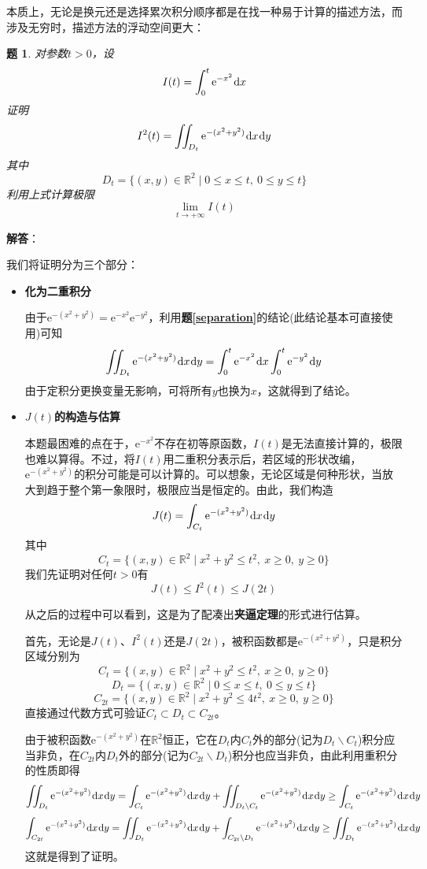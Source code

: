 \documentclass[a4paper,UTF8,fontset=windows,AutoFakeBold]{ctexart}
\newcommand*{\dr}{\hspace{0.07em}\mathrm{d}}
\newcommand*{\er}{\mathrm{e}}
\newcommand*{\rb}{\mathbb{R}}
\newcommand*{\note}{\noindent *}
\theoremstyle{ex}
\newtheorem{exercise}{题}
\newcommand{\exref}[1]{\textbf{题\;\ref{#1}\;}}
\newcommand{\sol}[1]{{\vspace{5pt}\kaishu\noindent\textbf{解答}：\vspace{-3pt}
\begin{compactitem}
    \item[] #1
\end{compactitem}
}}
\begin{document}
本质上，无论是换元还是选择累次积分顺序都是在找一种易于计算的描述方法，而涉及无穷时，描述方法的浮动空间更大：
\begin{framed}
\begin{exercise}\label{gauss}
    对参数$t>0$，设
    $$I(t)=\int_0^t\er^{-x^2}\dr x$$
    证明
    $$I^2(t)=\iint_{D_t}\er^{-(x^2+y^2)}\dr x\dr y$$
    其中
    $$D_t=\{(x,y)\in\rb^2\mid0\le x\le t,\ 0\le y\le t\}$$
    利用上式计算极限
    $$\lim_{t\to+\infty}I(t)$$
\end{exercise}
\sol{
    我们将证明分为三个部分：
    \begin{itemize}
        \item \textbf{化为二重积分}
        
        由于$\er^{-(x^2+y^2)}=\er^{-x^2}\er^{-y^2}$，利用\exref{separation}的结论(此结论基本可直接使用)可知
        $$\iint_{D_t}\er^{-(x^2+y^2)}\dr x\dr y=\int_0^t\er^{-x^2}\dr x\int_0^t\er^{-y^2}\dr y$$
        由于定积分更换变量无影响，可将所有$y$也换为$x$，这就得到了结论。

        \item \textbf{$J(t)$的构造与估算}

        本题最困难的点在于，$\er^{-x^2}$不存在初等原函数，$I(t)$是无法直接计算的，极限也难以算得。不过，将$I(t)$用二重积分表示后，若区域的形状改编，$\er^{-(x^2+y^2)}$的积分可能是可以计算的。可以想象，无论区域是何种形状，当放大到趋于整个第一象限时，极限应当是恒定的。由此，我们构造
        $$J(t)=\int_{C_t}\er^{-(x^2+y^2)}\dr x\dr y$$
        其中
        $$C_t=\{(x,y)\in\rb^2\mid x^2+y^2\le t^2,\ x\ge0,\ y\ge0\}$$
        我们先证明对任何$t>0$有
        $$J(t)\le I^2(t)\le J(2t)$$

        \note 从之后的过程中可以看到，这是为了配凑出\textbf{夹逼定理}的形式进行估算。

        首先，无论是$J(t)$、$I^2(t)$还是$J(2t)$，被积函数都是$\er^{-(x^2+y^2)}$，只是积分区域分别为
        $$C_t=\{(x,y)\in\rb^2\mid x^2+y^2\le t^2,\ x\ge0,\ y\ge0\}$$
        $$D_t=\{(x,y)\in\rb^2\mid0\le x\le t,\ 0\le y\le t\}$$
        $$C_{2t}=\{(x,y)\in\rb^2\mid x^2+y^2\le 4t^2,\ x\ge0,\ y\ge0\}$$
        直接通过代数方式可验证$C_t\subset D_t\subset C_{2t}$。

        由于被积函数$\er^{-(x^2+y^2)}$在$\rb^2$恒正，它在$D_t$内$C_t$外的部分(记为$D_t\backslash C_t$)积分应当非负，在$C_{2t}$内$D_t$外的部分(记为$C_{2t}\backslash D_t$)积分也应当非负，由此利用重积分的性质即得
        $$\iint_{D_t}\er^{-(x^2+y^2)}\dr x\dr y=\int_{C_t}\er^{-(x^2+y^2)}\dr x\dr y+\iint_{D_t\backslash C_t}\er^{-(x^2+y^2)}\dr x\dr y\ge\int_{C_t}\er^{-(x^2+y^2)}\dr x\dr y$$
        $$\int_{C_{2t}}\er^{-(x^2+y^2)}\dr x\dr y=\iint_{D_t}\er^{-(x^2+y^2)}\dr x\dr y+\int_{C_{2t}\backslash D_t}\er^{-(x^2+y^2)}\dr x\dr y\ge\iint_{D_t}\er^{-(x^2+y^2)}\dr x\dr y$$
        这就是得到了证明。


\end{itemize}}
\end{framed}
\end{document}
